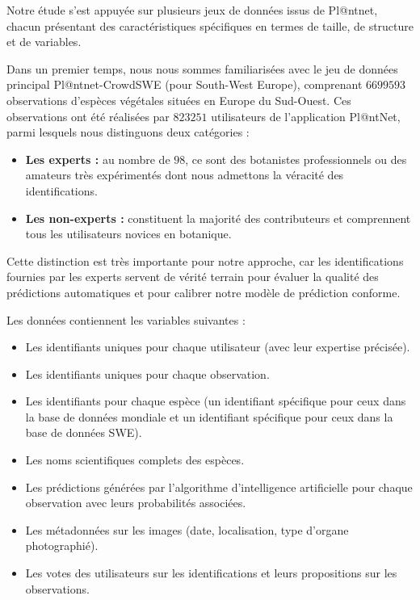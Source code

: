 \documentclass[a4paper,12pt]{article}
\begin{document}
Notre étude s'est appuyée sur plusieurs jeux de données issus de Pl@ntnet, chacun présentant des caractéristiques spécifiques en termes de taille, de structure et de variables.

\vspace{0.2cm}

Dans un premier temps, nous nous sommes familiarisées avec le jeu de données principal Pl@ntnet-CrowdSWE (pour South-West Europe), comprenant $\num{6 699 593}$ observations d'espèces végétales situées en Europe du Sud-Ouest. Ces observations ont été réalisées par $\num{823 251}$ utilisateurs de l'application Pl@ntNet, parmi lesquels nous distinguons deux catégories : 
\begin{itemize}
    \item \textbf{Les experts :} au nombre de $98$, ce sont des botanistes professionnels ou des amateurs très expérimentés dont nous admettons la véracité des identifications.
    \item \textbf{Les non-experts :} constituent la majorité des contributeurs et comprennent tous les utilisateurs novices en botanique.
\end{itemize}

\vspace{0.2cm}

Cette distinction est très importante pour notre approche, car les identifications fournies par les experts servent de vérité terrain pour évaluer la qualité des prédictions automatiques et pour calibrer notre modèle de prédiction conforme.

\vspace{0.2cm}

Les données contiennent les variables suivantes :
\begin{itemize}
    \item Les identifiants uniques pour chaque utilisateur (avec leur expertise précisée).
    \item Les identifiants uniques pour chaque observation.
    \item Les identifiants pour chaque espèce (un identifiant spécifique pour ceux dans la base de données mondiale et un identifiant spécifique pour ceux dans la base de données SWE).
    \item Les noms scientifiques complets des espèces.
    \item Les prédictions générées par l'algorithme d'intelligence artificielle pour chaque observation avec leurs probabilités associées.
    \item Les métadonnées sur les images (date, localisation, type d'organe photographié).
    \item Les votes des utilisateurs sur les identifications et leurs propositions sur les observations.
\end{itemize}
\end{document}
